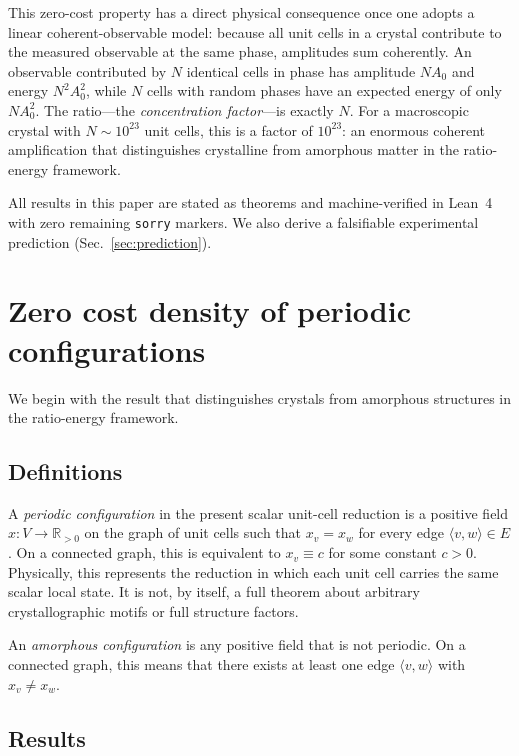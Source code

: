 \documentclass[prb,twocolumn,nofootinbib,superscriptaddress]{revtex4-2}
\newcommand{\Rp}{\mathbb{R}_{>0}}
\begin{document}
This zero-cost property has a direct physical consequence once one adopts a linear coherent-observable model: because all unit cells in a crystal contribute to the measured observable at the same phase, amplitudes sum coherently.
An observable contributed by $N$ identical cells in phase has amplitude $N A_0$ and energy $N^2 A_0^2$, while $N$ cells with random phases have an expected energy of only $N A_0^2$.
The ratio---the \emph{concentration factor}---is exactly $N$.
For a macroscopic crystal with $N \sim 10^{23}$ unit cells, this is a factor of $10^{23}$: an enormous coherent amplification that distinguishes crystalline from amorphous matter in the ratio-energy framework.

All results in this paper are stated as theorems and machine-verified in Lean~4 with zero remaining \texttt{sorry} markers.
We also derive a falsifiable experimental prediction (Sec.~\ref{sec:prediction}).

\section{Zero cost density of periodic configurations}
\label{sec:zero_cost}

We begin with the result that distinguishes crystals from amorphous structures in the ratio-energy framework.

\subsection{Definitions}

A \emph{periodic configuration} in the present scalar unit-cell reduction is a positive field $x: V \to \Rp$ on the graph of unit cells such that $x_v = x_w$ for every edge $\langle v,w \rangle \in E$.
On a connected graph, this is equivalent to $x_v \equiv c$ for some constant $c > 0$.
Physically, this represents the reduction in which each unit cell carries the same scalar local state.
It is not, by itself, a full theorem about arbitrary crystallographic motifs or full structure factors.

An \emph{amorphous configuration} is any positive field that is not periodic.
On a connected graph, this means that there exists at least one edge $\langle v,w \rangle$ with $x_v \neq x_w$.

\subsection{Results}
\end{document}
